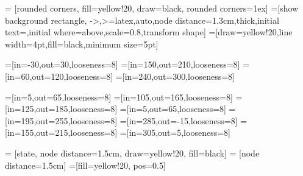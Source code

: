 
= [rounded corners, fill=yellow!20, draw=black, rounded corners=1ex]
=[show background rectangle, ->,>=latex,auto,node distance=1.3cm,thick,initial text=,initial where=above,scale=0.8,transform shape]
=[draw=yellow!20,line width=4pt,fill=black,minimum size=5pt]

=[in=-30,out=30,looseness=8]
=[in=150,out=210,looseness=8]
=[in=60,out=120,looseness=8]
=[in=240,out=300,looseness=8]

=[in=5,out=65,looseness=8]
=[in=105,out=165,looseness=8]
=[in=125,out=185,looseness=8]
=[in=5,out=65,looseness=8]
=[in=195,out=255,looseness=8]
=[in=285,out=-15,looseness=8]
=[in=155,out=215,looseness=8]
=[in=305,out=5,looseness=8]

 = [state, node distance=1.5cm, draw=yellow!20, fill=black]
 = [node distance=1.5cm]
=[fill=yellow!20, pos=0.5]
